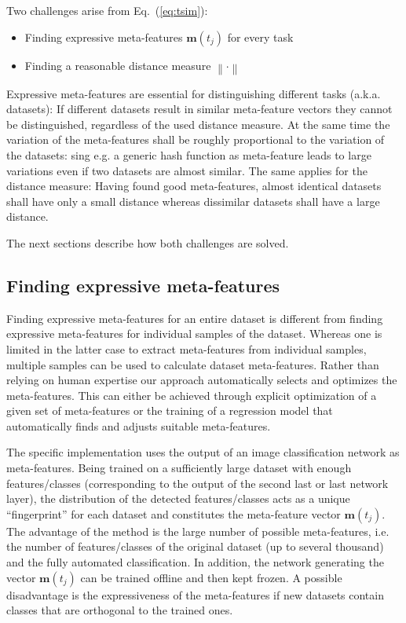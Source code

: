 \documentclass{article}
\begin{document}
Two challenges arise from Eq.~(\ref{eq:tsim}):
%
\begin{itemize}
\item Finding expressive meta-features $\mathbf{m}(t_j)$ for every task
\item Finding a reasonable distance measure $\left\| \cdot \right\|$ 
\end{itemize} 
%
Expressive meta-features are essential for distinguishing different tasks (a.k.a. datasets): If different datasets result in similar meta-feature vectors they cannot be distinguished, regardless of the used distance measure. At the same time the variation of the meta-features shall be roughly proportional to the variation of the datasets: sing e.g. a generic hash function as meta-feature leads to large variations even if two datasets are almost similar. The same applies for the distance measure: Having found good meta-features, almost identical datasets shall have only a small distance whereas dissimilar datasets shall have a large distance. 

The next sections describe how both challenges are solved.

\subsection{Finding expressive meta-features}
\label{sec:expressiveMeta}

Finding expressive meta-features for an entire dataset is different from finding expressive meta-features for individual samples of the dataset. Whereas one is limited in the latter case to extract meta-features from individual samples, multiple samples can be used to calculate dataset meta-features. Rather than relying on human expertise our approach automatically selects and optimizes the meta-features. This can either be achieved through explicit optimization of a given set of meta-features or the training of a regression model that automatically finds and adjusts suitable meta-features. 

The specific implementation uses the output of an image classification network as meta-features. Being trained on a sufficiently large dataset with enough features/classes (corresponding to the output of the second last or last network layer), the distribution of the detected features/classes acts as a unique ``fingerprint'' for each dataset and constitutes the meta-feature vector $\mathbf{m}(t_j)$. 
The advantage of the method is the large number of possible meta-features, i.e. the number of features/classes of the original dataset (up to several thousand) and the fully automated classification. In addition, the network generating the vector $\mathbf{m}(t_j)$ can be trained offline and then kept frozen. A possible disadvantage is the expressiveness of the meta-features if new datasets contain classes that are orthogonal to the trained ones.
\end{document}
